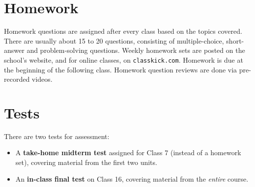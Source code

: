 \documentclass{../oss-handout}
\begin{document}
\section{Homework}
Homework questions are assigned after every class based on the topics covered.
There are usually about 15 to 20 questions, consisting of multiple-choice,
short-answer and problem-solving questions. Weekly homework sets are posted on
the school's website, and for online classes, on \texttt{classkick.com}.
Homework is due at the beginning of the following class. Homework question
reviews are done via pre-recorded videos.

%


\section{Tests}
There are two tests for assessment:
\begin{itemize}[nosep]
\item A \textbf{take-home midterm test} assigned for Class 7 (instead of a
  homework set), covering material from the first two units.
\item An \textbf{in-class final test} on Class 16, covering material from the
  \emph{entire} course.
\end{itemize}
\end{document}
